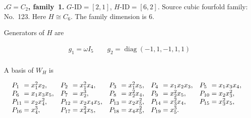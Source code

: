 \documentclass[12pt]{amsart}
\makeatletter
\numberwithin{equation}{section}
\theoremstyle{plain}
\theoremstyle{definition}
\theoremstyle{remark}
\DeclareMathOperator{\diag}{diag}
\newcommand{\PBasisLabel}[1]{\mathrlap{P_{#1}}\phantom{P_{99}}}
\newenvironment{SecEightAlignedBasis}[1]{%
  \begingroup\renewcommand{\arraystretch}{1.18}%
  \[\begin{array}{@{}#1@{}}%
}{\end{array}\]\endgroup}
\newenvironment{familydisplay}{%
  \begingroup
  \setlength{\arraycolsep}{1.35pt}%
  \renewcommand{\arraystretch}{0.96}%
  \setlength{\jot}{2pt}%
}{\endgroup}
\makeatother
\begin{document}
\par{}\medskip\noindent\textbf{.\enspace $G=C_2$, family~1.}\label{fam:threefold-no-31}
$G\text{-ID}=[2,1]$, $H\text{-ID}=[6,2]$.
Source cubic fourfold family: No.~123.  Here
$H\cong C_6$.
The family dimension is $6$.
\par\smallskip\noindent Generators of $H$ are\par\nopagebreak
\begin{familydisplay}
\begin{align*}
&g_{1}=\omega I_5
\qquad g_{2}=\diag(-1,1,-1,1,1)\\
\end{align*}
\end{familydisplay}
\par\smallskip\noindent A basis of $W_H$ is\par\nopagebreak
\begin{familydisplay}
\begin{SecEightAlignedBasis}{l@{\quad}l@{\quad}l@{\quad}l@{\quad}l}
\PBasisLabel{1}=x_{1}^{2}x_{2}, & \PBasisLabel{2}=x_{1}^{2}x_{4}, & \PBasisLabel{3}=x_{1}^{2}x_{5}, & \PBasisLabel{4}=x_{1}x_{2}x_{3}, & \PBasisLabel{5}=x_{1}x_{3}x_{4},\\
\PBasisLabel{6}=x_{1}x_{3}x_{5}, & \PBasisLabel{7}=x_{2}^{3}, & \PBasisLabel{8}=x_{2}^{2}x_{4}, & \PBasisLabel{9}=x_{2}^{2}x_{5}, & \PBasisLabel{10}=x_{2}x_{3}^{2},\\
\PBasisLabel{11}=x_{2}x_{4}^{2}, & \PBasisLabel{12}=x_{2}x_{4}x_{5}, & \PBasisLabel{13}=x_{2}x_{5}^{2}, & \PBasisLabel{14}=x_{3}^{2}x_{4}, & \PBasisLabel{15}=x_{3}^{2}x_{5},\\
\PBasisLabel{16}=x_{4}^{3}, & \PBasisLabel{17}=x_{4}^{2}x_{5}, & \PBasisLabel{18}=x_{4}x_{5}^{2}, & \multicolumn{2}{@{}l@{}}{\PBasisLabel{19}=x_{5}^{3}.}
\end{SecEightAlignedBasis}
\end{familydisplay}
\end{document}
